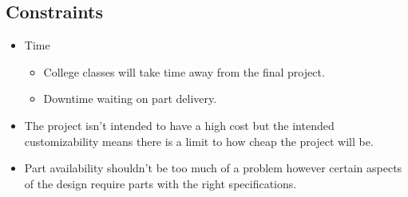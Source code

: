 \subsection{Constraints}
	\begin{itemize}
		\item Time
			\begin{itemize}
			\item College classes will take time away from the final project.
			\item Downtime waiting on part delivery.
			\end{itemize}
		\item The project isn't intended to have a high cost but the intended customizability means there is a limit to how cheap the project will be.
		\item Part availability shouldn't be too much of a problem however certain aspects of the design require parts with the right specifications.
	\end{itemize}